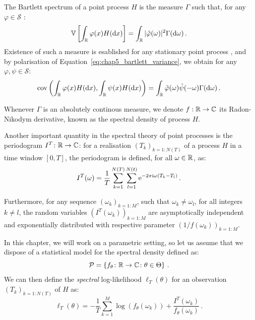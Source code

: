 The Bartlett spectrum of a point process $H$ is the measure $\Gamma$ such that, 
for any $\varphi\in\mathcal{S}$ \parencite[Definition 2]{Bremaud2005}:
\begin{equation}\label{eq:chap5_bartlett_variance}
    {\mathbb V}\left[\int_{{\mathbb R}}{\varphi(x)H({\mathrm{d}} x)}\right] = \int_{{\mathbb R}}{|\tilde\varphi(\omega)|^2\Gamma({\mathrm{d}} \omega)}\,.
\end{equation}
Existence of such a measure is esablished for any stationary point process \parencite[Proposition 8.2.I.(a)]{DaleyV1},
and by polarisation of Equation~\eqref{eq:chap5_bartlett_variance}, we obtain for any $\varphi, \psi \in \mathcal{S}$:
\begin{equation}\label{eq:chap5_bartlett_covariance}
    \operatorname{cov}\left(\int_{{\mathbb R}}{\varphi(x)H({\mathrm{d}} x)}, \int_{{\mathbb R}}{\psi(x)H({\mathrm{d}} x)}\right) = \int_{{\mathbb R}}{\tilde \varphi(\omega)\tilde \psi(-\omega)\Gamma({\mathrm{d}} \omega)}\,.
\end{equation}

Whenever $\Gamma$ is an absolutely continous measure, we denote $f:{\mathbb R}\to {\mathbb C}$ its Radon-Nikodym derivative, 
known as the spectral density of process $H$.

Another important quantity in the spectral theory of point processes is the periodogram $I^T\colon {\mathbb R} \to {\mathbb C}$:
for a realisation $(T_k)_{k=1:N(T)}$ of a process $H$ in a time window $[0,T]$, the periodogram is defined, for all $\omega\in{\mathbb R}$, as:
\[I^T(\omega) = \frac{1}{T}\sum_{k=1}^{N(T)}\sum_{l=1}^{N(t)}{\mathrm{e}^{-2\pi \mathrm{i} \omega (T_k - T_l)}}\,.\]

Furthermore, for any sequence $(\omega_k)_{k=1:M}$, such that $\omega_k \neq \omega_l$, for all integers $k\neq l$,
the random variables $(I^T(\omega_k))_{k=1:M}$ are asymptotically independent and exponentially distributed \parencite{Tuan1981} with respective parameter $(1/f(\omega_k))_{k=1:M}$.

In this chapter, we will work on a parametric setting, 
so let us assume that we dispose of a statistical model for the spectral density defined as:
\[
    \mathcal{P} = \left\{
        f_\theta \colon {\mathbb R} \to {\mathbb C} \colon \theta \in \Theta
    \right\}\,.
\]
We can then define the \textit{spectral} log-likelihood $\ell_T(\theta)$ for an observation $(T_k)_{k=1:N(T)}$ of $H$ as:
\begin{equation}\label{eq:chap5_spectral_ll}
    \ell_T(\theta) = -\frac{1}{T}\sum_{k=1}^{M}{\log(f_\theta (\omega_k)) + \frac{I^T(\omega_k)}{f_\theta(\omega_k)}}\,.
\end{equation}

